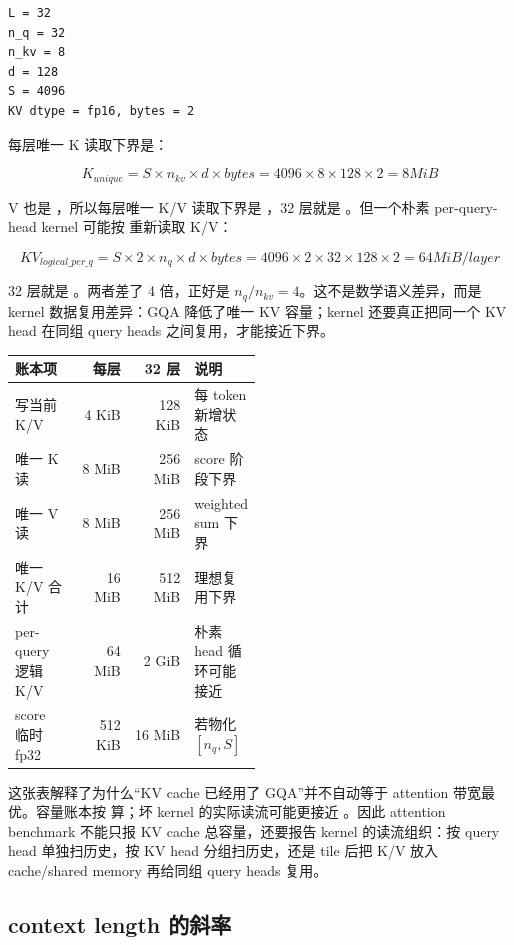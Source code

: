 \begin{lstlisting}[numbers=none,caption={7B attention 参数}]
L = 32
n_q = 32
n_kv = 8
d = 128
S = 4096
KV dtype = fp16, bytes = 2
\end{lstlisting}

每层唯一 K 读取下界是：

\[
K_{unique} = S \times n_{kv} \times d \times bytes
=4096 \times 8 \times 128 \times 2 = 8MiB
\]

V 也是 ，所以每层唯一 K/V 读取下界是 ，32 层就是 。但一个朴素 per-query-head kernel 可能按  重新读取 K/V：

\[
KV_{logical\_per\_q} =
S \times 2 \times n_q \times d \times bytes
=4096 \times 2 \times 32 \times 128 \times 2 = 64MiB/layer
\]

32 层就是 。两者差了 4 倍，正好是 \(n_q/n_{kv}=4\)。这不是数学语义差异，而是 kernel 数据复用差异：GQA 降低了唯一 KV 容量；kernel 还要真正把同一个 KV head 在同组 query heads 之间复用，才能接近下界。

\begin{center}
\begin{tabular}{p{0.25\linewidth}r r p{0.24\linewidth}}
\toprule
账本项 & 每层 & 32 层 & 说明 \\
\midrule
写当前 K/V & 4 KiB & 128 KiB & 每 token 新增状态 \\
唯一 K 读 & 8 MiB & 256 MiB & score 阶段下界 \\
唯一 V 读 & 8 MiB & 256 MiB & weighted sum 下界 \\
唯一 K/V 合计 & 16 MiB & 512 MiB & 理想复用下界 \\
per-query 逻辑 K/V & 64 MiB & 2 GiB & 朴素 head 循环可能接近 \\
score 临时 fp32 & 512 KiB & 16 MiB & 若物化 \([n_q,S]\) \\
\bottomrule
\end{tabular}
\end{center}

这张表解释了为什么“KV cache 已经用了 GQA”并不自动等于 attention 带宽最优。容量账本按  算；坏 kernel 的实际读流可能更接近 。因此 attention benchmark 不能只报 KV cache 总容量，还要报告 kernel 的读流组织：按 query head 单独扫历史，按 KV head 分组扫历史，还是 tile 后把 K/V 放入 cache/shared memory 再给同组 query heads 复用。

\subsection{context length 的斜率}

